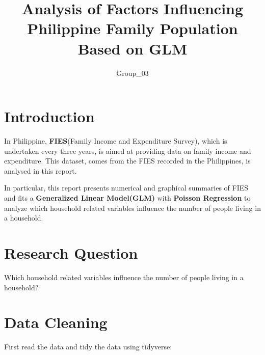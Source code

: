 \documentclass[
]{article}
\title{Analysis of Factors Influencing Philippine Family Population
Based on GLM}
\author{Group\_03}
\date{}
\begin{document}
\maketitle
\ifdefined\Shaded\renewenvironment{Shaded}{\begin{tcolorbox}[borderline west={3pt}{0pt}{shadecolor}, interior hidden, sharp corners, frame hidden, enhanced, boxrule=0pt, breakable]}{\end{tcolorbox}}\fi

\hypertarget{introduction}{%
\section{Introduction}\label{introduction}}

In Philippine, \textbf{FIES}(Family Income and Expenditure Survey),
which is undertaken every three years, is aimed at providing data on
family income and expenditure. This dataset, comes from the FIES
recorded in the Philippines, is analysed in this report.

In particular, this report presents numerical and graphical summaries of
FIES and fits a \textbf{Generalized Linear Model(GLM)} with
\textbf{Poisson Regression} to analyze which household related variables
influence the number of people living in a household.

\hypertarget{research-question}{%
\section{Research Question}\label{research-question}}

Which household related variables influence the number of people living
in a household?

\hypertarget{data-cleaning}{%
\section{Data Cleaning}\label{data-cleaning}}

First read the data and tidy the data using tidyverse:
\end{document}
